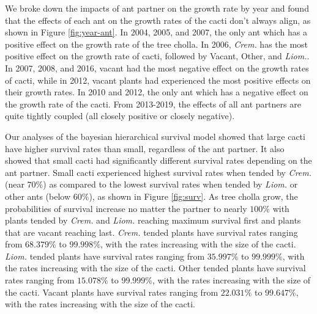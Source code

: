\documentclass[12pt,a4paper]{article}
\begin{document}
		We broke down the impacts of ant partner on the growth rate by year and found that the effects of each ant on the growth rates of the cacti don’t always align, as shown in Figure \ref{fig:year-ant}. 
		In 2004, 2005, and 2007, the only ant which has a positive effect on the growth rate of the tree cholla. 
		In 2006, \textit{Crem.} has the most positive effect on the growth rate of cacti, followed by Vacant, Other, and \textit{Liom.}. 
		In 2007, 2008, and 2016, vacant had the most negative effect on the growth rates of cacti, while in 2012, vacant plants had experienced the most positive effects on their growth rates. 
		In 2010 and 2012, the only ant which has a negative effect on the growth rate of the cacti. 
		From 2013-2019, the effects of all ant partners are quite tightly coupled (all closely positive or closely negative). 
		
		Our analyses of the bayesian hierarchical survival model showed that large cacti have higher survival rates than small, regardless of the ant partner. 
		It also showed that small cacti had significantly different survival rates depending on the ant partner. 
		Small cacti experienced highest survival rates when tended by \textit{Crem.} (near $70\%$) as compared to the lowest survival rates when tended by \textit{Liom.} or other ants (below $60\%$), as shown in Figure \ref{fig:surv}.
		As tree cholla grow, the probabilities of survival increase no matter the partner to nearly $100\%$ with plants tended by \textit{Crem.} and \textit{Liom.} reaching maximum survival first and plants that are vacant reaching last. 
		\textit{Crem.} tended plants have survival rates ranging from $68.379\%$ to $99.998\%$, with the rates increasing with the size of the cacti.  
		\textit{Liom.} tended plants have survival rates ranging from $35.997\%$ to $99.999\%$, with the rates increasing with the size of the cacti. 
		Other tended plants have survival rates ranging from $15.078\%$ to $99.999\%$, with the rates increasing with the size of the cacti. 
		Vacant plants have survival rates ranging from $22.031\%$ to $99.647\%$, with the rates increasing with the size of the cacti. 
		
\end{document}
